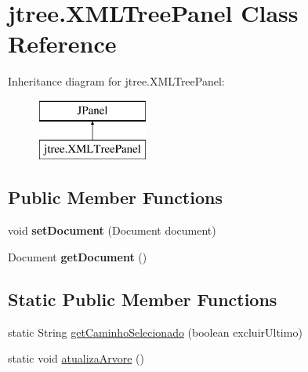\hypertarget{classjtree_1_1_x_m_l_tree_panel}{\section{jtree.\+X\+M\+L\+Tree\+Panel Class Reference}
\label{classjtree_1_1_x_m_l_tree_panel}
}
Inheritance diagram for jtree.\+X\+M\+L\+Tree\+Panel\+:\begin{figure}[H]
\begin{center}
\leavevmode
\includegraphics[height=2.000000cm]{classjtree_1_1_x_m_l_tree_panel}
\end{center}
\end{figure}
\subsection*{Public Member Functions}
\begin{DoxyCompactItemize}
\item 
\hypertarget{classjtree_1_1_x_m_l_tree_panel_a5f8ecd1ae6e234f8390d1c721874f316}{void {\bfseries set\+Document} (Document document)}\label{classjtree_1_1_x_m_l_tree_panel_a5f8ecd1ae6e234f8390d1c721874f316}

\item 
\hypertarget{classjtree_1_1_x_m_l_tree_panel_ade28954653ce35c35f40600e0b3e93ba}{Document {\bfseries get\+Document} ()}\label{classjtree_1_1_x_m_l_tree_panel_ade28954653ce35c35f40600e0b3e93ba}

\end{DoxyCompactItemize}
\subsection*{Static Public Member Functions}
\begin{DoxyCompactItemize}
\item 
static String \hyperlink{classjtree_1_1_x_m_l_tree_panel_a81425c3872cdd53e2fd22fbf62525d27}{get\+Caminho\+Selecionado} (boolean excluir\+Ultimo)
\item 
static void \hyperlink{classjtree_1_1_x_m_l_tree_panel_af2187a25fe036fb8fee80bce7827747a}{atualiza\+Arvore} ()
\end{DoxyCompactItemize}
